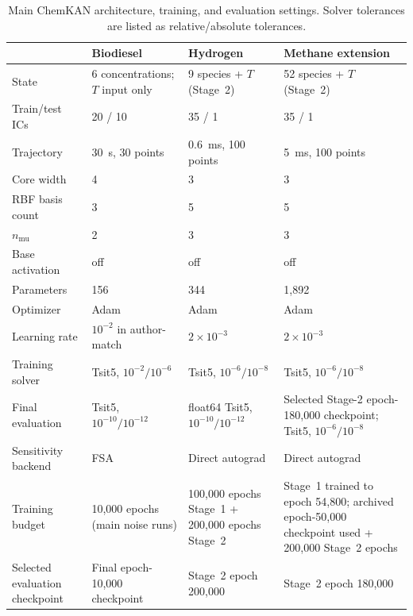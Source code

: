 \documentclass[11pt,a4paper]{article}
\begin{document}
\begin{table}[H]
\centering
\small
\caption{Main ChemKAN architecture, training, and
evaluation settings. Solver tolerances are listed
as relative/absolute tolerances.}
\label{tab:settings}
\begin{tabularx}{\textwidth}{@{}p{}XXX@{}}
\toprule
& \textbf{Biodiesel} & \textbf{Hydrogen} & \textbf{Methane extension} \\
\midrule
State
& 6 concentrations; $T$ input only
& 9 species + $T$ (Stage~2)
& 52 species + $T$ (Stage~2) \\

Train/test ICs & 20 / 10 & 35 / 1 & 35 / 1 \\

Trajectory & 30~s, 30 points & 0.6~ms, 100 points & 5~ms, 100 points \\

Core width & 4 & 3 & 3 \\

RBF basis count & 3 & 5 & 5 \\

$n_{\mathrm{mu}}$ & 2 & 3 & 3 \\

Base activation & off & off & off \\

Parameters & 156 & 344 & 1,892 \\

Optimizer & Adam & Adam & Adam \\

Learning rate 
& $10^{-2}$ in author-match 
& $2\times10^{-3}$ 
& $2\times10^{-3}$ \\

Training solver 
& Tsit5, $10^{-2}/10^{-6}$ 
& Tsit5, $10^{-6}/10^{-8}$ 
& Tsit5, $10^{-6}/10^{-8}$ \\

Final evaluation
& Tsit5, $10^{-10}/10^{-12}$
& float64 Tsit5, $10^{-10}/10^{-12}$
& Selected Stage-2 epoch-180,000 checkpoint;
  Tsit5, $10^{-6}/10^{-8}$ \\

Sensitivity backend
& FSA
& Direct autograd
& Direct autograd \\

Training budget
& 10,000 epochs (main noise runs)
& 100,000 epochs Stage~1 + 200,000 epochs Stage~2
& Stage~1 trained to epoch 54,800; archived epoch-50,000 checkpoint used + 200,000 Stage~2 epochs \\

Selected evaluation checkpoint
& Final epoch-10,000 checkpoint
& Stage~2 epoch 200,000
& Stage~2 epoch 180,000 \\
\bottomrule
\end{tabularx}
\end{table}
\end{document}
